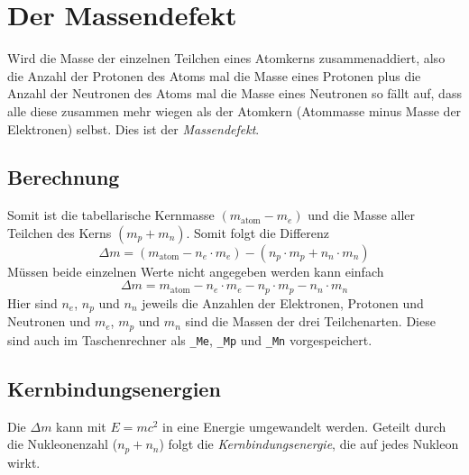 \documentclass{article}
\begin{document}
\section{Der Massendefekt}
Wird die Masse der einzelnen Teilchen eines Atomkerns zusammenaddiert, also die Anzahl der Protonen des Atoms mal die Masse eines Protonen plus die Anzahl der Neutronen des Atoms mal die Masse eines Neutronen so fällt auf, dass alle diese zusammen mehr wiegen als der Atomkern (Atommasse minus Masse der Elektronen) selbst. Dies ist der \emph{Massendefekt}.
 
\subsection{Berechnung} 
Somit ist die tabellarische Kernmasse $(m_{\text{atom}} - m_e)$ und die Masse aller Teilchen des Kerns $(m_p + m_n)$. Somit folgt die Differenz
\[ 
 \Delta m = (m_{\text{atom}} - n_e \cdot m_e) - (n_p \cdot m_p + n_n \cdot m_n)
\]
Müssen beide einzelnen Werte nicht angegeben werden kann einfach
\[ 
 \Delta m = m_{\text{atom}} - n_e \cdot m_e - n_p \cdot m_p - n_n \cdot m_n
\]
Hier sind $n_e$, $n_p$ und $n_n$ jeweils die Anzahlen der Elektronen, Protonen und Neutronen und $m_e$, $m_p$ und $m_n$ sind die Massen der drei Teilchenarten. Diese sind auch im Taschenrechner als \texttt{\_Me}, \texttt{\_Mp} und \texttt{\_Mn} vorgespeichert. 
 
\subsection{Kernbindungsenergien}  
Die $\Delta m$ kann mit $E=mc^2$ in eine Energie umgewandelt werden. Geteilt durch die Nukleonenzahl ($n_p + n_n$) folgt die \emph{Kernbindungsenergie}, die auf jedes Nukleon wirkt.
\end{document}
